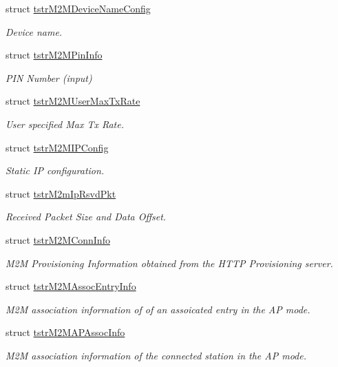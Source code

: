 \begin{DoxyCompactItemize}
struct \hyperlink{structtstrM2MDeviceNameConfig}{tstr\+M2\+M\+Device\+Name\+Config}
\begin{DoxyCompactList}\small\item\em Device name. \end{DoxyCompactList}\item 
struct \hyperlink{structtstrM2MPinInfo}{tstr\+M2\+M\+Pin\+Info}
\begin{DoxyCompactList}\small\item\em P\+IN Number (input) \end{DoxyCompactList}\item 
struct \hyperlink{structtstrM2MUserMaxTxRate}{tstr\+M2\+M\+User\+Max\+Tx\+Rate}
\begin{DoxyCompactList}\small\item\em User specified Max Tx Rate. \end{DoxyCompactList}\item 
struct \hyperlink{structtstrM2MIPConfig}{tstr\+M2\+M\+I\+P\+Config}
\begin{DoxyCompactList}\small\item\em Static IP configuration. \end{DoxyCompactList}\item 
struct \hyperlink{structtstrM2mIpRsvdPkt}{tstr\+M2m\+Ip\+Rsvd\+Pkt}
\begin{DoxyCompactList}\small\item\em Received Packet Size and Data Offset. \end{DoxyCompactList}\item 
struct \hyperlink{structtstrM2MConnInfo}{tstr\+M2\+M\+Conn\+Info}
\begin{DoxyCompactList}\small\item\em M2M Provisioning Information obtained from the H\+T\+TP Provisioning server. \end{DoxyCompactList}\item 
struct \hyperlink{structtstrM2MAssocEntryInfo}{tstr\+M2\+M\+Assoc\+Entry\+Info}
\begin{DoxyCompactList}\small\item\em M2M association information of of an assoicated entry in the AP mode. \end{DoxyCompactList}\item 
struct \hyperlink{structtstrM2MAPAssocInfo}{tstr\+M2\+M\+A\+P\+Assoc\+Info}
\begin{DoxyCompactList}\small\item\em M2M association information of the connected station in the AP mode. \end{DoxyCompactList}\item 

\end{DoxyCompactItemize}
